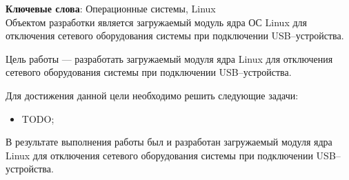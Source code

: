 \begin{essay}{}
    \noindent\textbf{Ключевые слова}: Операционные системы, Linux\\

    Объектом разработки является загружаемый модуль ядра ОС Linux для отключения сетевого оборудования системы при подключении USB--устройства.

    Цель работы --- разработать загружаемый модуля ядра Linux для отключения сетевого оборудования системы при подключении USB--устройства.

    Для достижения данной цели необходимо решить следующие задачи:

    \begin{itemize}
        \item TODO;
    \end{itemize}

    В результате выполнения работы был и разработан загружаемый модуля ядра Linux для отключения сетевого оборудования системы при подключении USB--устройства.
\end{essay}
